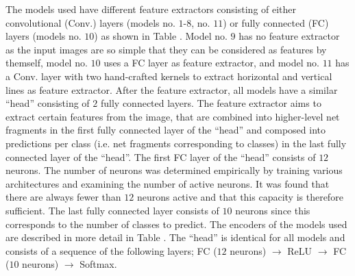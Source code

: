 The models used have different feature extractors consisting of either convolutional (Conv.) layers (models no. $1$-$8$, no. $11$) or fully connected (FC) layers (models no. $10$) as shown in Table .
Model no. $9$ has no feature extractor as the input images are so simple that they can be considered as features by themself, model no. $10$ uses a FC layer as feature extractor, and model no. $11$ has a Conv. layer with two hand-crafted kernels to extract horizontal and vertical lines as feature extractor.
After the feature extractor, all models have a similar ``head'' consisting of $2$ fully connected layers.
The feature extractor aims to extract certain features from the image, that are combined into higher-level net fragments in the first fully connected layer of the ``head'' and composed into predictions per class (i.e. net fragments corresponding to classes) in the last fully connected layer of the ``head''.
The first FC layer of the ``head'' consists of $12$ neurons.
The number of neurons was determined empirically by training various architectures and examining the number of active neurons.
It was found that there are always fewer than $12$ neurons active and that this capacity is therefore sufficient.
The last fully connected layer consists of $10$ neurons since this corresponds to the number of classes to predict.
The encoders of the models used are described in more detail in Table .
The ``head'' is identical for all models and consists of a sequence of the following layers; FC ($12$ neurons) $\rightarrow$ ReLU $\rightarrow$ FC ($10$ neurons) $\rightarrow$ Softmax.

